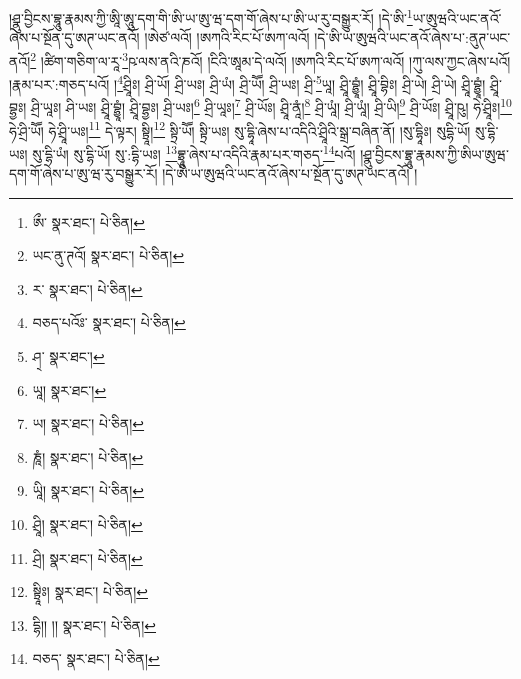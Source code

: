 །ཤྣུ་བྱིངས་བྷཱུ་རྣམས་ཀྱི་ཨཱི་ཨཱུ་དག་གི་ཨི་ཡ་ཨུ་ཝ་དག་གོ་ཞེས་པ་ཨི་ཡ་རུ་བསྒྱུར་རོ། །དེ་ཨི་\footnote{ཨྀ་  སྣར་ཐང་།  པེ་ཅིན། }ཡ་ཨུཝའི་ཡང་ནའོ་ཞེས་པ་སྔོན་དུ་ཨཊ་ཡང་ནའོ། །ཨེཙ་ལའོ། །ཨཀའི་རིང་པོ་ཨཀ་ལའོ། །དེ་ཨི་ཡ་ཨུཝའི་ཡང་ནའོ་ཞེས་པ་:ནུཊ་ཡང་ནའོ།\footnote{ཡང་ནུ་ཊའོ།  སྣར་ཐང་།  པེ་ཅིན། } །ཚིག་གཅིག་ལ་རཱ་\footnote{ར་  སྣར་ཐང་།  པེ་ཅིན། }ཥ་ལས་ནའི་ཎའོ། །ངིའི་ཨཱམ་དེ་ལའོ། །ཨཀའི་རིང་པོ་ཨཀ་ལའོ། །ཀུ་ལས་ཀྱང་ཞེས་པའོ། །རྣམ་པར་:གཅད་པའོ། །\footnote{བཅད་པའོཿ་  སྣར་ཐང་།  པེ་ཅིན། }ཤྲཱིཿ། ཤྲི་ཡོ། ཤྲི་ཡཿ། ཤྲི་ཡཾ། ཤྲི་ཡཽ། ཤྲི་ཡཿ། ཤྲི་\footnote{ཤ྄་  སྣར་ཐང་། }ཡཱ། ཤྲཱི་བྷྱཱཾ། ཤྲཱི་བྷིཿ། ཤྲི་ཡེ། ཤྲི་ཡེ། ཤྲཱི་བྷྱཱཾ། ཤྲཱི་བྷྱཿ། ཤྲི་ཡཱཿ། ཤི་ཡཿ། ཤྲཱི་བྷྱཱཾ། ཤྲཱི་བྷྱཿ། ཤྲི་ཡཿ།\footnote{ཡཱ།  སྣར་ཐང་། } ཤྲི་ཡཱཿ།\footnote{ཡ།  སྣར་ཐང་།  པེ་ཅིན། } ཤྲི་ཡོཿ། ཤྲཱི་ནཱཾ།\footnote{ཎཱཾ།  སྣར་ཐང་།  པེ་ཅིན། } ཤྲི་ཡཱཾ། ཤྲི་ཡཱཾ། ཤྲི་ཡི།\footnote{ཡཱི།  སྣར་ཐང་།  པེ་ཅིན། } ཤྲི་ཡོཿ། ཤྲཱི་ཥུ། ཧེ་ཤྲཱིཿ།\footnote{ཤྲཱི།  སྣར་ཐང་།  པེ་ཅིན། } ཧེ་ཤྲི་ཡཽ། ཧེ་ཤྲཱི་ཡཿ།\footnote{ཤྲི།  སྣར་ཐང་།  པེ་ཅིན། } དེ་ལྟར། སྟྲཱི།\footnote{སྟྲཱིཿ།  སྣར་ཐང་།  པེ་ཅིན། } སྟྲི་ཡཽ། སྟྲི་ཡཿ། སུ་དྷཱི་ཞེས་པ་འདིའི་ཤྲཱིའི་སྒྲ་བཞིན་ནོ། །སུ་དྷཱིཿ། སུདྷི་ཡོ། སུ་དྷི་ཡཿ། སུ་དྷི་ཡཾ། སུ་དྷི་ཡོ། སུ་:དྷི་ཡཿ། \footnote{དྷི།། །།   སྣར་ཐང་།  པེ་ཅིན། }བྷྲཱུ་ཞེས་པ་འདིའི་རྣམ་པར་གཅད་\footnote{བཅད་  སྣར་ཐང་།  པེ་ཅིན། }པའོ། །ཤྣུ་བྱིངས་བྷྲཱུ་རྣམས་ཀྱི་ཨིཡ་ཨུཝ་དག་གོ་ཞེས་པ་ཨུ་ཝ་རུ་བསྒྱུར་རོ། །དེ་ཨི་ཡ་ཨུཝའི་ཡང་ནའོ་ཞེས་པ་སྔོན་དུ་ཨཊ་ཡང་ནའོ། །
